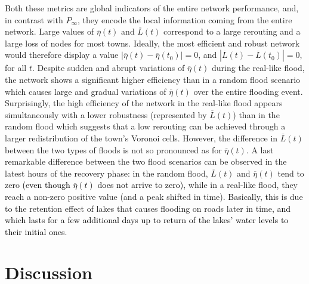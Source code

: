 \documentclass[twocolumn,fleqn,10pt]{wlscirep}
\begin{document}
Both these metrics are global indicators of the entire network performance, and, in contrast with $P_{\infty}$, they encode the local information coming from the entire network. Large values of $\overline{\eta}(t)$ and $\overline{L}(t)$ correspond to a large rerouting and a large loss of nodes for most towns. Ideally, the most efficient and robust network would therefore display a value $|\overline{\eta}(t) - \overline{\eta}(t_0)| = 0$, and $|\overline{L}(t) - \overline{L}(t_0)| = 0$, for all $t$. Despite sudden and abrupt variations of $\overline{\eta}(t)$ during the real-like flood, the network shows a significant higher efficiency than in a random flood scenario which causes large and gradual variations of $\overline{\eta}(t)$ over the entire flooding event. Surprisingly, the high efficiency of the network in the real-like flood appears simultaneously with a lower robustness (represented by $\overline{L}(t)$) than in the random flood which suggests that a low rerouting can be achieved through a larger redistribution of the town's Voronoi cells. However, the difference in $\overline{L}(t)$ between the two types of floods is not so pronounced as for $\overline{\eta}(t)$. A last remarkable difference between the two flood scenarios can be observed in the latest hours of the recovery phase: in the random flood, $\overline{L}(t)$ and $\overline{\eta}(t)$ tend to zero \textcolor{black}{(even though $\overline{\eta}(t)$ does not arrive to zero)}, while in a real-like flood, they reach a non-zero positive value (and a peak shifted in time)\textcolor{black}{. Basically, this is} due to the retention effect of lakes that causes flooding on roads later in time\textcolor{black}{, and which lasts for a few additional days up to return of the lakes' water levels to their initial ones}.





\section*{Discussion}
\label{Discussion}
\end{document}
